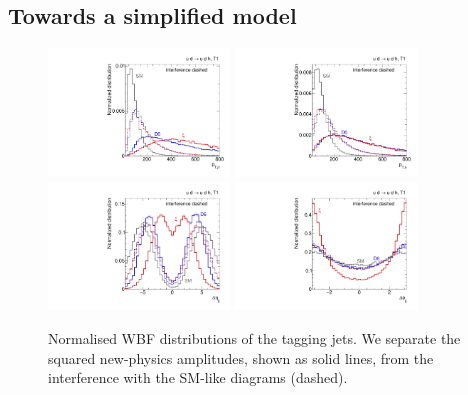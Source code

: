 \subsection{Towards a simplified model}
\label{sec:validity_simplified}

\begin{figure}[t]
  \includegraphics[width=0.43\textwidth]{fig/validity/WBF_separate_T1_j1pt.pdf} 
  \hspace*{0.05\textwidth}
  \includegraphics[width=0.43\textwidth]{fig/validity/WBF_separate_T1_Hpt.pdf}\\
  \includegraphics[width=0.43\textwidth]{fig/validity/WBF_separate_T1_deltaEtaJJ.pdf} 
  \hspace*{0.05\textwidth}
  \includegraphics[width=0.43\textwidth]{fig/validity/WBF_separate_T1_deltaPhiJJ.pdf}
  \caption{Normalised WBF distributions of the tagging jets. We separate
    the squared new-physics amplitudes, shown as solid lines, from the
    interference with the SM-like diagrams (dashed).}
  \label{fig:validity_squared_separate}
\end{figure}

